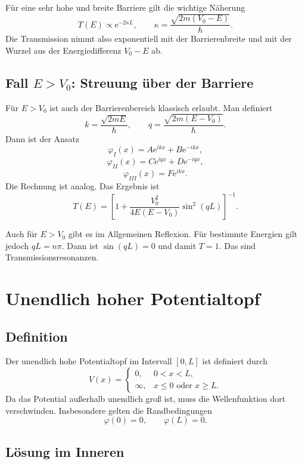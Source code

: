 \begin{formulabox}
Für eine sehr hohe und breite Barriere gilt die wichtige Näherung
\[
    T(E)\propto \mathrm{e}^{-2\kappa L},
    \qquad
    \kappa=\frac{\sqrt{2m(V_0-E)}}{\hbar}.
\]
Die Transmission nimmt also exponentiell mit der Barrierenbreite und mit der Wurzel aus der Energiedifferenz $V_0-E$ ab.
\end{formulabox}

\subsection{Fall $E>V_0$: Streuung über der Barriere}

Für $E>V_0$ ist auch der Barrierenbereich klassisch erlaubt. Man definiert
\[
    k=\frac{\sqrt{2mE}}{\hbar},
    \qquad
    q=\frac{\sqrt{2m(E-V_0)}}{\hbar}.
\]
Dann ist der Ansatz
\[
    \varphi_I(x)=A\mathrm{e}^{ikx}+B\mathrm{e}^{-ikx},
\]
\[
    \varphi_{II}(x)=C\mathrm{e}^{iqx}+D\mathrm{e}^{-iqx},
\]
\[
    \varphi_{III}(x)=F\mathrm{e}^{ikx}.
\]
Die Rechnung ist analog. Das Ergebnis ist
\[
    T(E)=\left[1+\frac{V_0^2}{4E(E-V_0)}\sin^2(qL)\right]^{-1}.
\]

\begin{conceptbox}
Auch für $E>V_0$ gibt es im Allgemeinen Reflexion. Für bestimmte Energien gilt jedoch $qL=n\pi$. Dann ist $\sin(qL)=0$ und damit $T=1$. Das sind Transmissionsresonanzen.
\end{conceptbox}

\section{Unendlich hoher Potentialtopf}

\subsection{Definition}

Der unendlich hohe Potentialtopf im Intervall $[0,L]$ ist definiert durch
\[
    V(x)=
    \begin{cases}
        0, & 0<x<L,\\
        \infty, & x\le 0\text{ oder }x\ge L.
    \end{cases}
\]
Da das Potential außerhalb unendlich groß ist, muss die Wellenfunktion dort verschwinden. Insbesondere gelten die Randbedingungen
\[
    \varphi(0)=0,
    \qquad
    \varphi(L)=0.
\]

\subsection{Lösung im Inneren}

